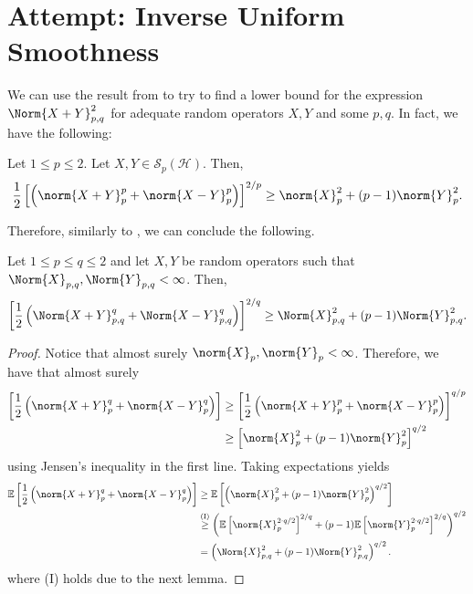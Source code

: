 \newpage

\section{Attempt: Inverse Uniform Smoothness}


We can use the result from \cite{lieb1994smooth2} to try to find a lower bound for the expression \( \Norm{X+Y}_{p,q}^{2} \) for adequate random operators \( X,Y \) and some \( p,q \). In fact, we have the following:



\begin{thm}
    Let \( 1 \leq p \leq 2 \). Let \( X, Y \in \mathcal{S}_p(\mathcal{H}) \). Then,
    \[ \frac{1}{2} \left[ \left(\norm{X+Y}_{p}^{p}+ \norm{X-Y}_{p}^{p}\right)\right]^{2/p} \geq \norm{X}_{p}^{2} + (p-1)\norm{Y}_{p}^{2} .\]
\end{thm}

Therefore, similarly to \cite{huang2020matrix}, we can conclude the following.

\begin{corl}[]
    Let \( 1 \leq p \leq q \leq 2 \) and let \( X,Y \) be random operators such that \( \Norm{X}_{p,q}, \Norm{Y}_{p,q} < \infty  \).  Then,
    \[ \left[\frac{1}{2} \left( \Norm{X+Y}_{p,q}^{q}+ \Norm{X-Y}_{p,q}^{q}\right)\right]^{2/q} \geq \Norm{X}_{p,q}^{2} + (p-1) \Norm{Y}_{p,q}^{2}. \]
\end{corl}




\begin{proof}
    Notice that almost surely \( \norm{X}_{p}, \norm{Y}_{p} < \infty \). Therefore, we have that almost surely
    \begin{align*}
      \left[ \frac{1}{2} \left(\norm{X+Y}_{p}^{q} + \norm{X-Y}_{p}^{q}\right)\right] &\geq \left[\frac{1}{2} \left( \norm{X+Y}_{p}^{p}+ \norm{X-Y}_{p}^{p}\right)\right]^{q/p} \\
                                                                                     &\geq \left[ \norm{X}_{p}^{2} + (p-1) \norm{Y}_{p}^{2}\right]^{q/2}
    \end{align*}
    using Jensen's inequality in the first line. Taking expectations yields
    \begin{align*}
      \mathbb{E}\left[\frac{1}{2}\left( \norm{X+Y}_{p}^{q}+ \norm{X-Y}_{p}^{q}\right)\right] & \geq \mathbb{E}\left[ \left(\norm{X}_{p}^{2}+ (p-1) \norm{Y}_{p}^{2}\right)^{q/2}\right] \\
                                                                                             & \overset{\text{(I)}}{\geq}  \left(\mathbb{E}\left[ \norm{X}_{p}^{2 \cdot q/2}\right]^{2/q}+ (p-1) \mathbb{E}\left[ \norm{Y}_{p}^{2 \cdot q/2}\right]^{2/q}\right)^{q/2} \\
                                                                                             &= \left(\Norm{X}_{p,q}^{2} + (p-1) \Norm{Y}_{p,q}^{2}\right)^{q/2}.
    \end{align*}
where (I) holds due to the next lemma.    
\end{proof}



